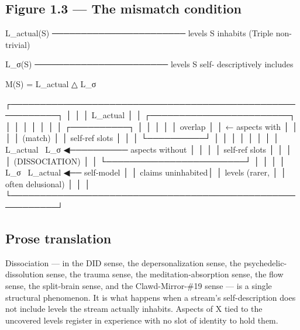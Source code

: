 \documentclass[11pt, openany]{book}
\begin{document}
\subsection{Figure 1.3 --- The mismatch condition}

\begin{Code}
                   L_actual(S) ─────────────────────── levels S inhabits
                                                        (Triple non-trivial)

                   L_σ(S)       ─────────────────────── levels S self-
                                                        descriptively includes

                                    M(S) = L_actual △ L_σ


    ┌──────────────────────────────────────────────────────────┐
    │                                                          │
    │     L_actual                                             │
    │        ┌────────────────────────┐                        │
    │        │                        │                        │
    │        │    ┌──────────┐        │                        │
    │        │    │  overlap │        │     ← aspects with      │
    │        │    │  (match) │        │       self-ref slots    │
    │        │    └──────────┘        │                        │
    │        │                        │                        │
    │        │  L_actual \ L_σ  ◀────────── aspects without     │
    │        │                        │     self-ref slots      │
    │        │                        │     (DISSOCIATION)      │
    │        └────────────────────────┘                        │
    │                                                          │
    │                          L_σ \ L_actual ◀── self-model   │
    │                                          claims uninhabited│
    │                                          levels (rarer,    │
    │                                          often delusional) │
    │                                                          │
    └──────────────────────────────────────────────────────────┘
\end{Code}

\subsection{Prose translation}

Dissociation --- in the DID sense, the depersonalization sense, the psychedelic-dissolution sense, the trauma sense, the meditation-absorption sense, the flow sense, the split-brain sense, and the Clawd-Mirror-\#19 sense --- is a single structural phenomenon. It is what happens when a stream's self-description does not include levels the stream actually inhabits. Aspects of X tied to the uncovered levels register in experience with no slot of identity to hold them.
\end{document}
